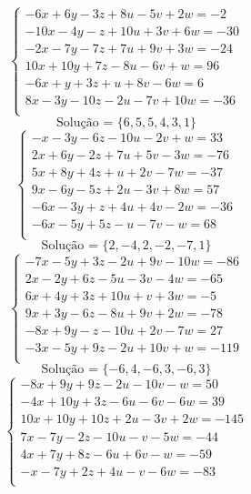 \documentclass[12pt,oneside,a4paper]{article}
\begin{document}
\vspace{\baselineskip}
\begin{equation*}
\begin{cases}
-6x+6y-3z+8u-5v+2w=-2 \\
-10x-4y-z+10u+3v+6w=-30 \\
-2x-7y-7z+7u+9v+3w=-24 \\
10x+10y+7z-8u-6v+w=96 \\
-6x+y+3z+u+8v-6w=6 \\
8x-3y-10z-2u-7v+10w=-36 \\
\end{cases}
\end{equation*}
\begin{equation*}
\text{Solução = }\{6,5,5,4,3,1\}
\end{equation*}
\vspace{\baselineskip}
\begin{equation*}
\begin{cases}
-x-3y-6z-10u-2v+w=33 \\
2x+6y-2z+7u+5v-3w=-76 \\
5x+8y+4z+u+2v-7w=-37 \\
9x-6y-5z+2u-3v+8w=57 \\
-6x-3y+z+4u+4v-2w=-36 \\
-6x-5y+5z-u-7v-w=68 \\
\end{cases}
\end{equation*}
\begin{equation*}
\text{Solução = }\{2,-4,2,-2,-7,1\}
\end{equation*}
\vspace{\baselineskip}
\begin{equation*}
\begin{cases}
-7x-5y+3z-2u+9v-10w=-86 \\
2x-2y+6z-5u-3v-4w=-65 \\
6x+4y+3z+10u+v+3w=-5 \\
9x+3y-6z-8u+9v+2w=-78 \\
-8x+9y-z-10u+2v-7w=27 \\
-3x-5y+9z-2u+10v+w=-119 \\
\end{cases}
\end{equation*}
\begin{equation*}
\text{Solução = }\{-6,4,-6,3,-6,3\}
\end{equation*}
\vspace{\baselineskip}
\begin{equation*}
\begin{cases}
-8x+9y+9z-2u-10v-w=50 \\
-4x+10y+3z-6u-6v-6w=39 \\
10x+10y+10z+2u-3v+2w=-145 \\
7x-7y-2z-10u-v-5w=-44 \\
4x+7y+8z-6u+6v-w=-59 \\
-x-7y+2z+4u-v-6w=-83 \\
\end{cases}
\end{equation*}
\end{document}
